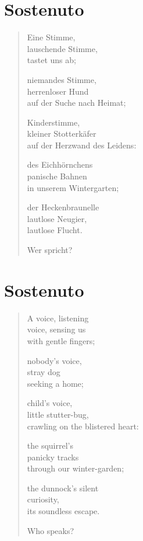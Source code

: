 
\cleartoverso

\section{Sostenuto}

\begin{verse}
Eine Stimme,\\
lauschende Stimme,\\
tastet uns ab;

niemandes Stimme,\\
herrenloser Hund\\
auf der Suche nach Heimat;

Kinderstimme,\\
kleiner Stotterkäfer\\
auf der Herzwand des Leidens:

des Eichhörnchens\\
panische Bahnen\\
in unserem Wintergarten;

der Heckenbraunelle\\
lautlose Neugier,\\
lautlose Flucht.

Wer spricht?
\end{verse}

\cleartorecto

\section{Sostenuto}

\begin{verse}
A voice, listening\\
voice, sensing us\\
with gentle fingers;

nobody's voice,\\
stray dog\\
seeking a home;

child's voice,\\
little stutter-bug,\\
crawling on the blistered heart:

the squirrel's\\
panicky tracks\\
through our winter-garden;

the dunnock's silent\\
curiosity,\\
its soundless escape.

Who speaks?
\end{verse}
